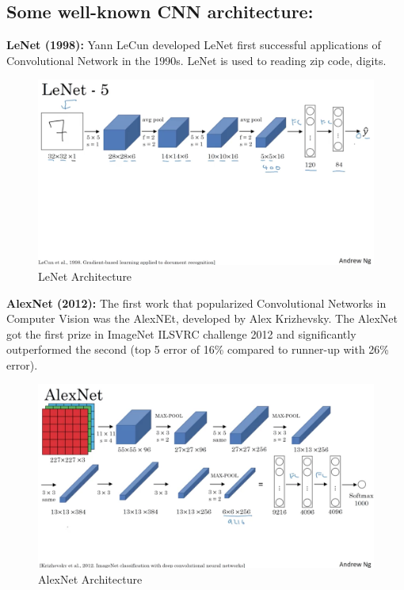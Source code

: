 \subsection{Some well-known CNN architecture:}
\textbf{LeNet (1998):} Yann LeCun developed LeNet first successful applications of Convolutional Network in the 1990s. LeNet is used to reading zip code, digits.
\begin{center}
  \begin{figure}[H]
  \centering
  \includegraphics[width=1\columnwidth]{images/chap2/LeNet.png}
  \caption{LeNet Architecture}
  \label{chap2:WSP}
  \end{figure}
\end{center}
\vspace{-1cm}
\textbf{AlexNet (2012):} The first work that popularized Convolutional Networks in Computer Vision was the AlexNEt, developed by Alex Krizhevsky. The AlexNet got the first prize in ImageNet ILSVRC challenge 2012 and significantly outperformed the second (top 5 error of 16\% compared to runner-up with 26\% error).  
\begin{center}
  \begin{figure}[H]
  \centering
  \includegraphics[width=1\columnwidth]{images/chap2/AlexNet.png}
  \caption{AlexNet Architecture}
  \label{chap2:WSP}
  \end{figure}
\end{center}
